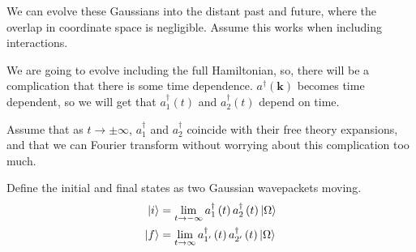 \documentclass[11pt, oneside]{article}   	%
\theoremstyle{slanted}
\let\vec\mathbf
\begin{document}
We can evolve these Gaussians into the 
distant past and future, 
where the overlap in coordinate space is negligible. 
Assume this works when including interactions. 

We are going to evolve including the full Hamiltonian, so, 
there will be a complication that there is 
some time dependence. $ a ^\dagger \left( \vec{k}  \right)  $  
becomes time dependent, so 
we will get that $ a _  1 ^\dagger \left( t  \right)  $ and $ a _ 2 ^\dagger \left( t  \right)  $ 
depend on time. 

Assume that as $ t \to \pm \infty $, $ a _ 1 ^\dagger $ and $ a _ 2 ^\dagger $ 
coincide with their free theory 
expansions, and that we can Fourier transform 
without worrying about this complication too much. 

Define the initial and final states
as two Gaussian wavepackets moving. 
\begin{align*}
\ket{ i }  & = \lim _{ t \to- \infty } a _1 ^\dagger \left( t  \right)  a _ 2 ^\dagger \left( t  \right)  \ket{ \Omega } \\
\ket{ f } &=  \lim_{t \to \infty  } a _{1 ' } ^{ \dagger } \left(  t  \right)
a _{ 2 ' } ^\dagger \left( t  \right)  \ket{ \Omega } \\
\end{align*}
\end{document}
